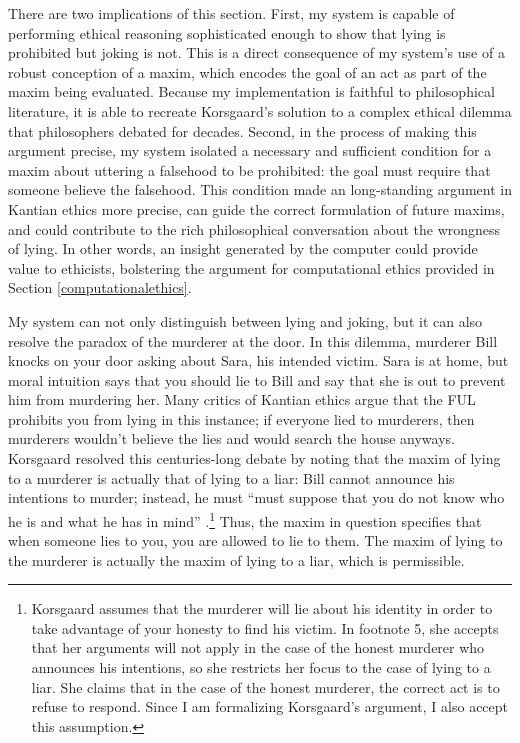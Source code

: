 \begin{isabellebody}
\begin{isamarkuptext}
There are two implications of this section. First, my system is capable of performing ethical reasoning
sophisticated enough to show that lying is prohibited but joking is not. This is a direct consequence 
of my system's use of a robust conception of a maxim, which encodes the goal of an act as part of the 
maxim being evaluated. Because my implementation is faithful to philosophical literature, it is able 
to recreate Korsgaard's solution to a complex ethical dilemma that philosophers debated for decades. Second, 
in the process of making this argument precise, my system isolated a necessary and sufficient condition 
for a maxim about uttering a falsehood to be prohibited: the goal must require that someone believe
the falsehood. This condition made an long-standing argument in Kantian ethics more precise, can guide 
the correct formulation of future maxims, and could contribute to the rich philosophical conversation
about the wrongness of lying. In other words, an insight generated by the
computer could provide value to ethicists, bolstering the argument for computational ethics provided in 
Section \ref{computationalethics}.%
\end{isamarkuptext}\isamarkuptrue%
%
\isadelimdocument
%
\endisadelimdocument
%
\isatagdocument
%
\isamarkuptrue%
%
\endisatagdocument
{\isafolddocument}%
%
\isadelimdocument
%
\endisadelimdocument
%
\begin{isamarkuptext}%
My system can not only distinguish between lying and joking, but it can also resolve the paradox of 
the murderer at the door. In this dilemma, murderer Bill knocks on your door asking about Sara, his 
intended victim. Sara is at home, but moral intuition says that you should lie to Bill and say 
that she is out to prevent him from murdering her. Many critics of Kantian ethics argue that the 
FUL prohibits you from lying in this instance; if everyone lied to murderers, then murderers wouldn't 
believe the lies and would search the house anyways. Korsgaard resolved this centuries-long debate by 
noting that the maxim of lying to a murderer is actually that of lying to a liar: Bill cannot 
announce his intentions to murder; instead, he must ``must suppose that you do not know who he is 
and what he has in mind'' \citep{KorsgaardRTL}.\footnote{Korsgaard assumes that the murderer will 
lie about his identity in order to take advantage of your honesty to find his victim. In footnote 5, 
she accepts that her arguments will not apply in the case of the honest murderer 
who announces his intentions, so she restricts her focus to the case of lying to a liar. She claims 
that in the case of the honest murderer, the correct act is to refuse to respond. Since I am formalizing
Korsgaard's argument, I also accept this assumption.} Thus, the maxim 
in question specifies that when someone lies to you, you are allowed to lie to them. The maxim of 
lying to the murderer is actually the maxim of lying to a liar, which is permissible. 


\end{isamarkuptext}
\end{isabellebody}
